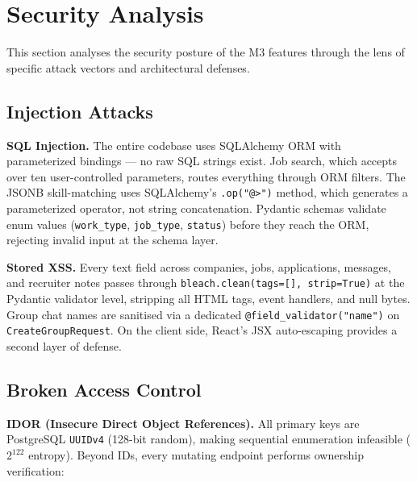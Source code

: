 
\section{Security Analysis}
\label{sec:security_m3}

This section analyses the security posture of the M3 features through the lens of specific attack vectors and architectural defenses.

\subsection{Injection Attacks}

\textbf{SQL Injection.} The entire codebase uses SQLAlchemy ORM with parameterized bindings — no raw SQL strings exist. Job search, which accepts over ten user-controlled parameters, routes everything through ORM filters. The JSONB skill-matching uses SQLAlchemy's \texttt{.op("@>")} method, which generates a parameterized operator, not string concatenation. Pydantic schemas validate enum values (\texttt{work\_type}, \texttt{job\_type}, \texttt{status}) before they reach the ORM, rejecting invalid input at the schema layer.

\textbf{Stored XSS.} Every text field across companies, jobs, applications, messages, and recruiter notes passes through \texttt{bleach.clean(tags=[], strip=True)} at the Pydantic validator level, stripping all HTML tags, event handlers, and null bytes. Group chat names are sanitised via a dedicated \texttt{@field\_validator("name")} on \texttt{CreateGroupRequest}. On the client side, React's JSX auto-escaping provides a second layer of defense.

\subsection{Broken Access Control}

\textbf{IDOR (Insecure Direct Object References).} All primary keys are PostgreSQL \texttt{UUIDv4} (128-bit random), making sequential enumeration infeasible ($2^{122}$ entropy). Beyond IDs, every mutating endpoint performs ownership verification:

